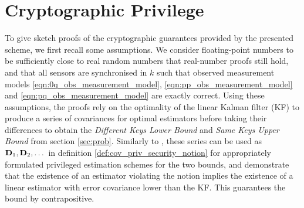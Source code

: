 \documentclass[conference]{IEEEtran}
\theoremstyle{definition}
\theoremstyle{remark}
\begin{document}
% 
%                                                                   
%                                                                   
%                                                                   
% 

\section{Cryptographic Privilege}\label{sec:crypto}
To give sketch proofs of the cryptographic guarantees provided by the presented scheme, we first recall some assumptions. We consider floating-point numbers to be sufficiently close to real random numbers that real-number proofs still hold, and that all sensors are synchronised in $k$ such that observed measurement models \eqref{eqn:0q_obs_measurement_model}, \eqref{eqn:pp_obs_measurement_model} and \eqref{eqn:pq_obs_measurement_model} are exactly correct. Using these assumptions, the proofs rely on the optimality of the linear Kalman filter (KF) \cite{haugBayesianEstimationTracking2012} to produce a series of covariances for optimal estimators before taking their differences to obtain the \textit{Different Keys Lower Bound} and \textit{Same Keys Upper Bound} from section \ref{sec:prob}. Similarly to \cite{risticCryptographicallyPrivilegedState2022}, these series can be used as ${{\mathbf{D}}}_1,{{\mathbf{D}}}_2,\dots$ in definition \ref{def:cov_priv_security_notion} for appropriately formulated privileged estimation schemes for the two bounds, and demonstrate that the existence of an estimator violating the notion implies the existence of a linear estimator with error covariance lower than the KF. This guarantees the bound by contrapositive.

% 
% 
\end{document}
